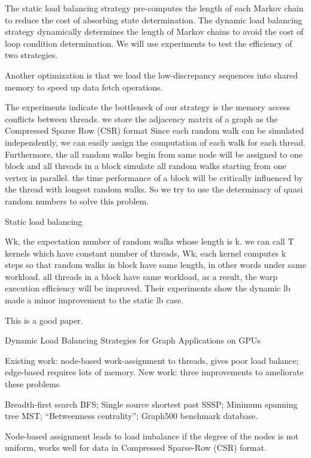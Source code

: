 \documentclass{article}
\begin{document}
The static load balancing strategy pre-computes the length of each Markov chain to reduce the cost of absorbing state determination. The dynamic load balancing strategy dynamically determines the length of Markov chains to avoid the cost of loop condition determination. We will use experiments to test the efficiency of two strategies. 

Another optimization is that we load the low-discrepancy sequences into shared memory to speed up data fetch operations. 

The experiments indicate the bottleneck of our strategy is the memory access conflicts between threads. 
we store the adjacency matrix of a graph as the Compressed Sparse Row (CSR) format 
Since each random walk can be simulated independently, we can easily assign the computation of each walk for each thread. Furthermore, the all random walks begin from same node will be assigned to one block and all threads in a block simulate all random walks starting from one vertex in parallel. 
the time performance of a block will be critically influenced by the thread with longest random walks. 
So we try to use the determinacy of quasi random numbers to solve this problem.

Static load balancing

Wk, the expectation number of random walks whose length is k. we can call T kernels which have constant number of threads, Wk, each kernel computes k steps so that random walks in block have same length, in other words under same workload.   
all threads in a block have same workload, as a result, the warp execution efficiency will be improved. 
Their experiments show the dynamic lb made a minor improvement to the static lb case.

This is a good paper.





\cite{dlbgraphgpu}


Dynamic Load Balancing Strategies for Graph Applications on GPUs 

Existing work: node-based work-assignment to threads, gives poor load balance; edge-based requires lots of memory.
New work: three improvements to ameliorate these problems

Breadth-first search BFS;
Single source shortest past SSSP;
Minimum spanning tree MST;
“Betweenness centrality”;
Graph500 benchmark database.

Node-based assignment leads to load imbalance if the degree of the nodes is not uniform, works well for data in Compressed Sparse-Row (CSR) format.
\end{document}
